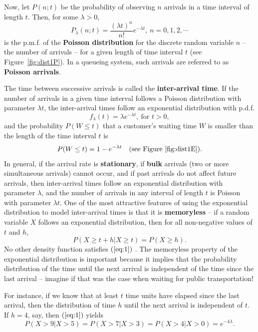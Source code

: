 Now, let $P(n;t)$ be the probability of observing $n$ arrivals in a time interval of length $t$.
Then, for some $\lambda>0$, 
$$ P_{\lambda}(n; t) = \frac{(\lambda t)^n}{n!} e^{-\lambda t}, \ n=0,1,2,\cdots$$
is the p.m.f. of the \textbf{Poisson distribution} for the discrete random variable $n$ -- the number of arrivals -- for a given length of time interval $t$ (see Figure~\ref{fig:dist1P}). In a queueing system, such arrivals are referred to as \textbf{Poisson arrivals}. \par The time between successive arrivals is called the \textbf{inter-arrival time}. If the number of arrivals in a given time interval follows a Poisson distribution with parameter $\lambda t$, the inter-arrival times follow an exponential distribution with p.d.f. 
$$ f_{\lambda}(t) = \lambda e^{-\lambda t}, \ \textrm{for }t>0,$$ and the probability $P(W\leq t)$ that a customer's waiting time $W$ is smaller than the length of the time interval $t$ is  
$$P(W\leq t) = 1 - e^{-\lambda t}\quad \textrm{(see Figure~\ref{fig:dist1E})}.$$
In general, if the arrival rate is \textbf{stationary}, if \textbf{bulk} arrivals (two or more simultaneous arrivals) cannot occur, and if past arrivals do not affect future arrivals, then inter-arrival times follow an exponential distribution with parameter $\lambda$, and the number of arrivals in any interval of length $t$ is Poisson with parameter $\lambda t$. \newl One of the most attractive features of using the exponential distribution to model inter-arrival times is that it is \textbf{memoryless} --  if a random variable $X$ follows an exponential distribution, then for all non-negative values of $t$ and $h$,
\begin{equation}
P(X \geq t + h|X \geq t) = P(X \geq h). 
\label{eq:1}
\end{equation}
No other density function satisfies $(\ref{eq:1})$ \cite{QS_R}. The memoryless property of the exponential distribution is important because it implies that the probability distribution of the time until the next arrival is independent of the time since the last arrival -- imagine if that was the case when waiting for public transportation! \par For instance, if we know that at least $t$ time units have elapsed since the last arrival, then the distribution of time $h$ until the next arrival is independent of $t$. If $h=4$, say, then $(\ref{eq:1})$ yields 
$$ P(X>9|X>5)= P(X>7|X>3) = P(X>4|X>0) = e^{-4 \lambda}.$$

